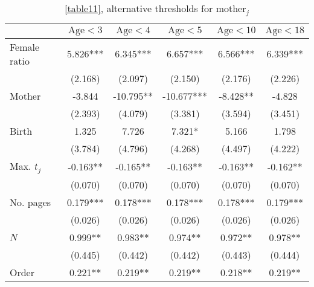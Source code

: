 \begin{table}[H]
    \footnotesize
    \centering
    \begin{threeparttable}
        \caption{\autoref{table11}, alternative thresholds for \(\text{mother}_j\)}
        \label{tableC18}
        \begin{tabular}{p{4cm}SSSSS}
            \toprule
            &{\(\text{Age}<3\)}&{\(\text{Age}<4\)}&{\(\text{Age}<5\)}&{\(\text{Age}<10\)}&{\(\text{Age}<18\)}\\
            \midrule
            Female ratio                  &       5.826***&       6.345***&       6.657***&       6.566***&       6.339***\\
                                          &     (2.168)   &     (2.097)   &     (2.150)   &     (2.176)   &     (2.226)   \\
            Mother                        &      -3.844   &     -10.795** &     -10.677***&      -8.428** &      -4.828   \\
                                          &     (2.393)   &     (4.079)   &     (3.381)   &     (3.594)   &     (3.451)   \\
            Birth                         &       1.325   &       7.726   &       7.321*  &       5.166   &       1.798   \\
                                          &     (3.784)   &     (4.796)   &     (4.268)   &     (4.497)   &     (4.222)   \\
            Max. \(t_j\)                  &      -0.163** &      -0.165** &      -0.163** &      -0.163** &      -0.162** \\
                                          &     (0.070)   &     (0.070)   &     (0.070)   &     (0.070)   &     (0.070)   \\
            No. pages                     &       0.179***&       0.178***&       0.178***&       0.178***&       0.179***\\
                                          &     (0.026)   &     (0.026)   &     (0.026)   &     (0.026)   &     (0.026)   \\
            \(N\)                         &       0.999** &       0.983** &       0.974** &       0.972** &       0.978** \\
                                          &     (0.445)   &     (0.442)   &     (0.442)   &     (0.443)   &     (0.444)   \\
            Order                         &       0.221** &       0.219** &       0.219** &       0.218** &       0.219** \\

\end{tabular}
\end{threeparttable}
\end{table}
